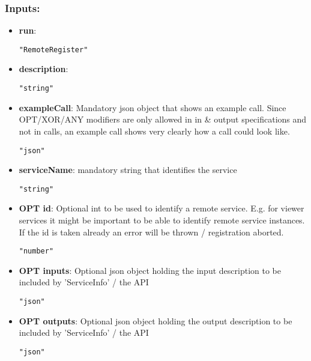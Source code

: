 \subsubsection*{Inputs:}
\begin{itemize}
    \item \textbf{run}: 
\begin{lstlisting}
"RemoteRegister"
\end{lstlisting}
    \item \textbf{description}: 
\begin{lstlisting}
"string"
\end{lstlisting}
    \item \textbf{exampleCall}: Mandatory json object that shows an example call. Since OPT/XOR/ANY  modifiers are only allowed in in \& output specifications and not in  calls, an example call shows very clearly how a call could look like.
\begin{lstlisting}
"json"
\end{lstlisting}
    \item \textbf{serviceName}: mandatory string that identifies the service
\begin{lstlisting}
"string"
\end{lstlisting}
    \item \textbf{OPT id}: Optional int to be used to identify a remote service. E.g. for  viewer services it might be important to be able to identify remote  service instances. If the id is taken already an error will be thrown /  registration aborted.
\begin{lstlisting}
"number"
\end{lstlisting}
    \item \textbf{OPT inputs}: Optional json object holding the input description to be included by 'ServiceInfo' / the API
\begin{lstlisting}
"json"
\end{lstlisting}
    \item \textbf{OPT outputs}: Optional json object holding the output description to be included by 'ServiceInfo' / the API
\begin{lstlisting}
"json"
\end{lstlisting}
  \end{itemize}

